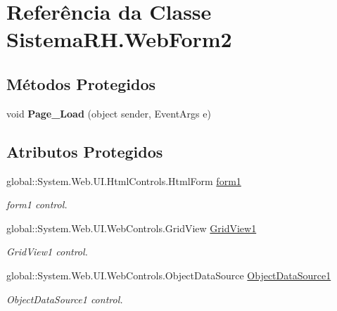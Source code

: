 \hypertarget{class_sistema_r_h_1_1_web_form2}{
\section{Referência da Classe SistemaRH.WebForm2}
\label{class_sistema_r_h_1_1_web_form2}
}
\subsection*{Métodos Protegidos}
\begin{DoxyCompactItemize}
\item 
\hypertarget{class_sistema_r_h_1_1_web_form2_acc1a4c68eab48705681898efa1aab117}{
void {\bfseries Page\_\-Load} (object sender, EventArgs e)}
\label{class_sistema_r_h_1_1_web_form2_acc1a4c68eab48705681898efa1aab117}

\end{DoxyCompactItemize}
\subsection*{Atributos Protegidos}
\begin{DoxyCompactItemize}
\item 
global::System.Web.UI.HtmlControls.HtmlForm \hyperlink{class_sistema_r_h_1_1_web_form2_a4cd20c1aed78d91db68974b5d568dc80}{form1}
\begin{DoxyCompactList}\small\item\em form1 control. \item\end{DoxyCompactList}\item 
global::System.Web.UI.WebControls.GridView \hyperlink{class_sistema_r_h_1_1_web_form2_a8e21dcacbf8b6417b31a14bb872f784e}{GridView1}
\begin{DoxyCompactList}\small\item\em GridView1 control. \item\end{DoxyCompactList}\item 
global::System.Web.UI.WebControls.ObjectDataSource \hyperlink{class_sistema_r_h_1_1_web_form2_a308e7686dc9dd73babcd0c2cf737aeb4}{ObjectDataSource1}
\begin{DoxyCompactList}\small\item\em ObjectDataSource1 control. \item\end{DoxyCompactList}\end{DoxyCompactItemize}


